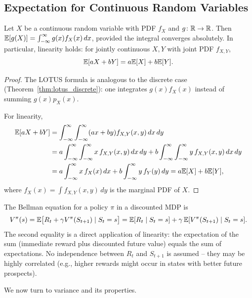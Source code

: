 \documentclass[11pt,a4paper]{article}
\begin{document}
\subsection{Expectation for Continuous Random Variables}

\begin{theorem}
\label{thm:lotus_continuous}
Let $X$ be a continuous random variable with PDF $f_X$ and
$g \colon \mathbb{R} \to \mathbb{R}$. Then
$\mathbb{E}[g(X)] = \int_{-\infty}^{\infty} g(x) f_X(x)\,dx$,
provided the integral converges absolutely. In particular, linearity
holds: for jointly continuous $X, Y$ with joint PDF $f_{X,Y}$,
\[
    \mathbb{E}[aX + bY] = a\mathbb{E}[X] + b\mathbb{E}[Y].
\]
\end{theorem}

\begin{proof}
The LOTUS formula is analogous to the discrete case
(Theorem~\ref{thm:lotus_discrete}): one integrates $g(x) f_X(x)$
instead of summing $g(x) p_X(x)$.

For linearity,
\begin{align*}
    \mathbb{E}[aX + bY]
    &= \int_{-\infty}^{\infty}\int_{-\infty}^{\infty}
    (ax + by) f_{X,Y}(x,y)\,dx\,dy \\
    &= a\int_{-\infty}^{\infty}\int_{-\infty}^{\infty}
    x\,f_{X,Y}(x,y)\,dx\,dy
    + b\int_{-\infty}^{\infty}\int_{-\infty}^{\infty}
    y\,f_{X,Y}(x,y)\,dx\,dy \\
    &= a\int_{-\infty}^{\infty} x\,f_X(x)\,dx
    + b\int_{-\infty}^{\infty} y\,f_Y(y)\,dy
    = a\mathbb{E}[X] + b\mathbb{E}[Y],
\end{align*}
where $f_X(x) = \int f_{X,Y}(x,y)\,dy$ is the marginal PDF of $X$.
\end{proof}

\begin{rlconnection}[title={Linearity and Value Function Decomposition}]
The Bellman equation for a policy $\pi$ in a discounted MDP is
\[
    V^\pi(s) = \mathbb{E}\bigl[R_t + \gamma V^\pi(S_{t+1}) \mid S_t = s\bigr]
    = \mathbb{E}[R_t \mid S_t = s] + \gamma \, \mathbb{E}[V^\pi(S_{t+1}) \mid S_t = s].
\]
The second equality is a direct application of linearity: the
expectation of the sum (immediate reward plus discounted future value)
equals the sum of expectations. No independence between $R_t$ and
$S_{t+1}$ is assumed -- they may be highly correlated (e.g., higher
rewards might occur in states with better future prospects).
\end{rlconnection}

We now turn to variance and its properties.
\end{document}
